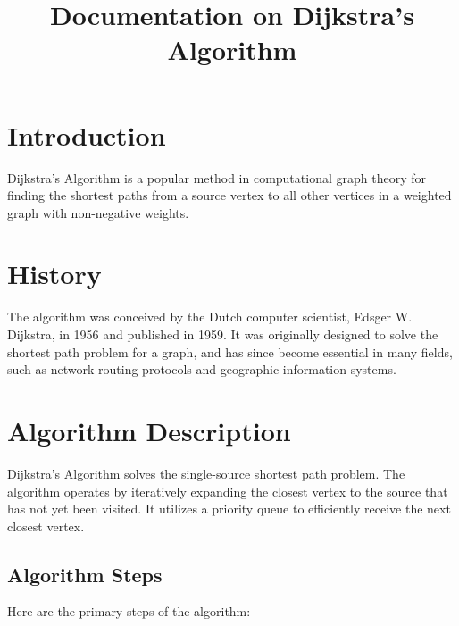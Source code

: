 \documentclass{article}
\title{Documentation on Dijkstra's Algorithm}
\author{}
\date{}
\begin{document}
\maketitle

\section{Introduction}

Dijkstra's Algorithm is a popular method in computational graph theory for finding the shortest paths from a source vertex to all other vertices in a weighted graph with non-negative weights.

\section{History}

The algorithm was conceived by the Dutch computer scientist, Edsger W. Dijkstra, in 1956 and published in 1959. It was originally designed to solve the shortest path problem for a graph, and has since become essential in many fields, such as network routing protocols and geographic information systems.

\section{Algorithm Description}

Dijkstra's Algorithm solves the single-source shortest path problem. The algorithm operates by iteratively expanding the closest vertex to the source that has not yet been visited. It utilizes a priority queue to efficiently receive the next closest vertex.

\subsection{Algorithm Steps}

Here are the primary steps of the algorithm:
\end{document}
